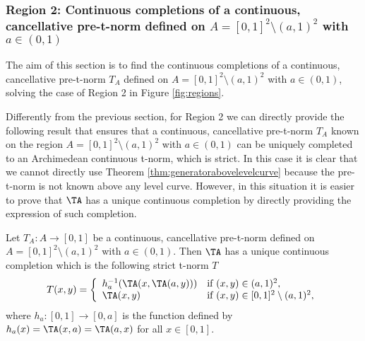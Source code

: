 \subsubsection{Region 2: Continuous completions of a continuous, cancellative pre-t-norm defined on $A=[0,1]^2 \setminus (a,1)^2$ with $a \in (0,1)$}\label{subsection:can:Region2}

The aim of this section is to find the continuous completions of a continuous, cancellative pre-t-norm $T_A$ defined on $A=[0,1]^2 \setminus (a,1)^2$ with $a \in (0,1)$, solving the case of Region 2 in Figure \ref{fig:regions}.

Differently from the previous section, for Region 2 we can directly provide the following result that ensures that a continuous, cancellative pre-t-norm $T_A$ known on the region $A=[0,1]^2 \setminus (a,1)^2$ with $a \in (0,1)$ can be uniquely completed to an Archimedean continuous t-norm, which is strict. In this case it is clear that we cannot directly use Theorem \ref{thm:generatorabovelevelcurve} because the pre-t-norm \TA is not known above any level curve. However, in this situation it is easier to prove that $\TA$ has a unique continuous completion by directly providing the expression of such completion.

\begin{theorem}\label{thm:can:completion(a,1)} Let $T_A: A \to [0,1]$ be a continuous, cancellative pre-t-norm defined on $A=[0,1]^2 \setminus (a,1)^2$ with $a \in (0,1)$. Then $\TA$ has a unique continuous completion which is the following strict t-norm $T$
	\begin{equation}\label{eq:can:Completion(a,1)}
		T(x,y)
		=
		\left\{ \begin{array}{ll}
			h_a^{-1}(\TA(x,\TA(a,y))) & \text{if } (x,y) \in (a,1)^2,\\
			\TA(x,y) &   \text{if }   (x,y) \in [0,1]^2 \setminus (a,1)^2,
		\end{array} \right.
	\end{equation}
where $h_a:[0,1] \to [0,a]$ is the function defined by $h_a(x)=\TA(x,a)=\TA(a,x)$ for all $x \in [0,1]$.
\end{theorem}

